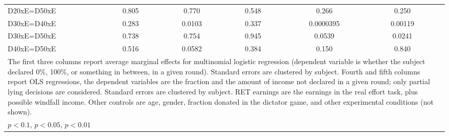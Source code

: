 \begin{tabular}{l|cccccc|cc|cc}
D20xE=D50xE     &    0.805         &         &    0.770         &         &    0.548         &         &    0.266         &         &    0.250         &         \\
D30xE=D40xE     &    0.283         &         &   0.0103         &         &    0.337         &         &0.0000395         &         &  0.00119         &         \\
D30xE=D50xE     &    0.738         &         &    0.754         &         &    0.945         &         &   0.0539         &         &   0.0241         &         \\
D40xE=D50xE     &    0.516         &         &   0.0582         &         &    0.384         &         &    0.150         &         &    0.840         &         \\
\hline\hline
\multicolumn{11}{p{18cm}}{\tiny The first three columns report average marginal effects for multinomial logistic regression (dependent variable is whether the subject declared 0\%, 100\%, or something in between, in a given round). Standard errors are clustered by subject. Fourth and fifth columns report OLS regressions, the dependent variables are the fraction and the amount of income not declared in a given round; only partial lying decisions are considered. Standard errors are clustered by subject. RET earnings are the earnings in the real effort task, plus possible windfall income. Other controls are age, gender, fraction donated in the dictator game, and other experimental conditions (not shown). }\\
\multicolumn{11}{l}{\tiny \sym{*} \(p<0.1\), \sym{**} \(p<0.05\), \sym{***} \(p<0.01\)}\\
\end{tabular}